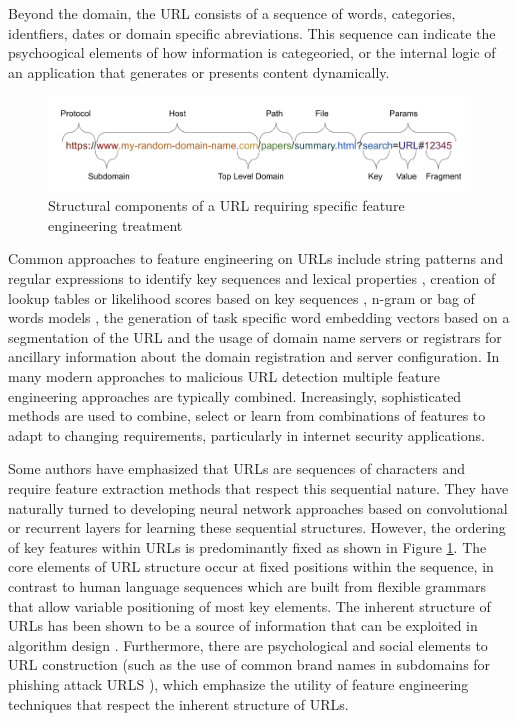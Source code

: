 \documentclass[sigconf]{acmart}
\begin{document}
Beyond the domain, the URL consists of a sequence of words, categories, identfiers, dates
or domain specific abreviations. This sequence can indicate the psychoogical elements of how
information is categeoried, or the internal logic of an application that generates or presents
content dynamically. 

\begin{figure}
\centering
\includegraphics[scale=0.6]{images/URL_parts.png}
\caption{Structural components of a URL requiring specific feature engineering treatment}
\label{fig:url_structure}
\end{figure}

Common approaches to feature engineering on URLs include string patterns and regular expressions to
identify key sequences and lexical properties \cite{Kan2004,Garera2007,Mamun2016,Tupsamudre2019}, 
creation of lookup tables or likelihood scores based on key sequences
\cite{Meshkizadeh2010}, n-gram or bag of words models \cite{Baykan2009,Verma2017}, 
the generation of task specific word embedding vectors based on a segmentation of the URL \cite{Le2018,Qiu2020} and the
usage of domain name servers or registrars for ancillary information about the domain registration 
and server configuration\cite{Canali2011,Li2020}. In many modern approaches to malicious URL detection
multiple feature engineering approaches are typically combined\cite{Sayamber2014,Li2020}. Increasingly,
sophisticated methods are used to combine, select or learn from combinations of features to adapt to
changing requirements, particularly in internet security applications\cite{Sountharrajan2020,Li2020}.

Some authors have 
emphasized that URLs are sequences of characters and require feature extraction methods that respect 
this sequential nature\cite{Le2018,Vazhayil2018}. They have naturally turned to developing neural network approaches
based on convolutional or recurrent layers for learning these sequential structures.
However, the ordering of key features within URLs is predominantly fixed as shown in Figure \ref{fig:url_structure}.
The core elements of URL structure occur at fixed positions within the sequence, in contrast to human language
sequences which are built from flexible grammars that allow variable positioning of most key elements. The
inherent structure of URLs has been shown to be a source of information that can be exploited in 
algorithm design \cite{Shih2004}. Furthermore,
there are psychological and social elements to URL construction (such as the use of common brand names in subdomains
for phishing attack URLS \cite{Tupsamudre2019}), which emphasize the utility of feature engineering techniques that
respect the inherent structure of URLs.
\end{document}
